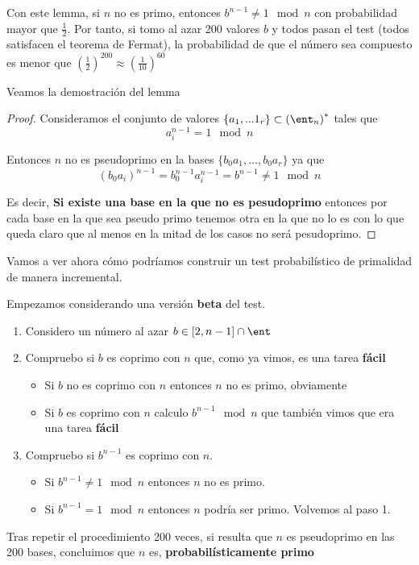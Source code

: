 Con este lemma, si $n$ no es primo, entonces $b^{n-1} \neq 1 \mod n$ con probabilidad mayor que $\frac{1}{2}$. Por tanto, si tomo al azar 200 valores $b$ y todos pasan el test (todos satisfacen el teorema de Fermat), la probabilidad de que el número sea compuesto es menor que $\left( \frac{1}{2}\right)^{200} \approx \left(\frac{1}{10}\right)^{60}$

Veamos la demostración del lemma
\begin{proof}
Consideramos el conjunto de valores $\{a_1,...1_r\} \subset \left(\ent_n\right)^*$ tales que 
\[a_i^{n-1} = 1 \mod n\]

Entonces $n$ no es pseudoprimo en la bases $\{b_0a_1,...,b_0a_r\}$ ya que 
\[(b_0a_i)^{n-1} = b_0^{n-1}a_i^{n-1} = b^{n-1} \neq 1 \mod n\]

Es decir, \textbf{Si existe una base en la que no es pesudoprimo} entonces por cada base en la que sea pseudo primo tenemos otra en la que no lo es con lo que queda claro que al menos en la mitad de los casos no será pesudoprimo.
\end{proof}

Vamos a ver ahora cómo podríamos construir un test probabilístico de primalidad de manera incremental.

Empezamos considerando una versión \textbf{beta} del test.
\begin{enumerate}
\item Considero un número al azar $b \in [2,n-1]\cap \ent$
\item Compruebo si $b$ es coprimo con $n$ que, como ya vimos, es una tarea \textbf{fácil}
\begin{itemize}
\item Si $b$ no es coprimo con $n$ entonces $n$ no es primo, obviamente
\item Si $b$ es coprimo con $n$ calculo $b^{n-1} \mod n$ que también vimos que era una tarea \textbf{fácil}
\end{itemize}
\item Compruebo si $b^{n-1}$ es coprimo con $n$.
\begin{itemize}
\item Si $b^{n-1}\neq 1 \mod n$ entonces $n$ no es primo.
\item Si $b^{n-1} = 1 \mod n$ entonces $n$ podría ser primo. Volvemos al paso 1.
\end{itemize}
\end{enumerate}

Tras repetir el procedimiento 200 veces, si resulta que $n$ es pseudoprimo en las 200 bases, concluimos que $n$ es, \textbf{probabilísticamente primo}

